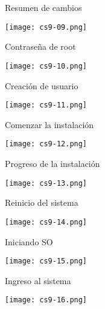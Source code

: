 \begin{frame}[c]{Resumen de cambios}
  \begin{center}
    \texttt{[image: cs9-09.png]}
  \end{center}
\end{frame}

\begin{frame}[c]{Contraseña de root}
  \begin{center}
    \texttt{[image: cs9-10.png]}
  \end{center}
\end{frame}

\begin{frame}[c]{Creación de usuario}
  \begin{center}
    \texttt{[image: cs9-11.png]}
  \end{center}
\end{frame}

\begin{frame}[c]{Comenzar la instalación}
  \begin{center}
    \texttt{[image: cs9-12.png]}
  \end{center}
\end{frame}

\begin{frame}[c]{Progreso de la instalación}
  \begin{center}
    \texttt{[image: cs9-13.png]}
  \end{center}
\end{frame}

\begin{frame}[c]{Reinicio del sistema}
  \begin{center}
    \texttt{[image: cs9-14.png]}
  \end{center}
\end{frame}

\begin{frame}[c]{Iniciando SO}
  \begin{center}
    \texttt{[image: cs9-15.png]}
  \end{center}
\end{frame}

\begin{frame}[c]{Ingreso al sistema}
  \begin{center}
    \texttt{[image: cs9-16.png]}
  \end{center}
\end{frame}

